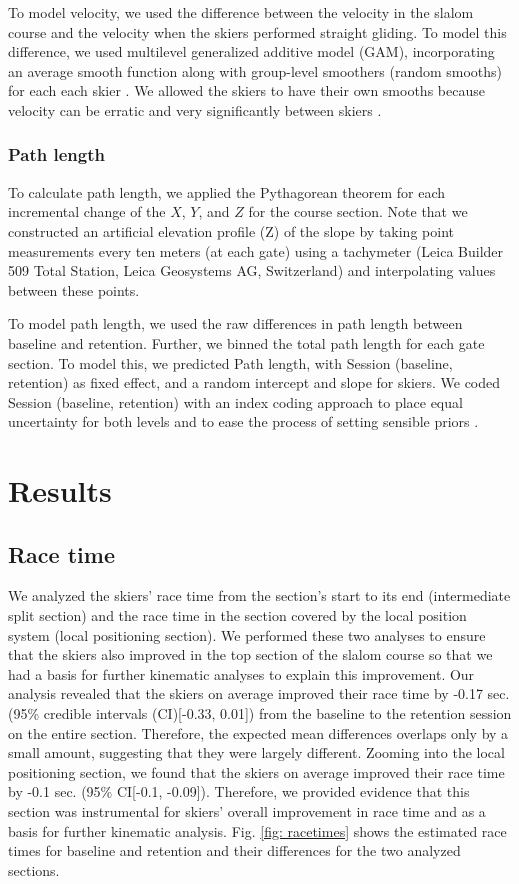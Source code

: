 \documentclass{article}
\begin{document}
To model velocity, we used the difference between the velocity in the slalom course and the velocity when the skiers performed straight gliding. To model this difference, we used multilevel generalized additive model (GAM), incorporating an average smooth function along with group-level smoothers (random smooths) for each each skier \cite{pedersen_hierarchical_2019}. We allowed the skiers to have their own smooths because velocity can be erratic and very significantly between skiers \cite{federolf_quantifying_2012, supej_impact_2015, reid_kinematic_2010}. 

\subsubsection{Path length}
To calculate path length, we applied the Pythagorean theorem for each incremental change of the $X$, $Y$, and $Z$ for the course section. Note that we constructed an artificial elevation profile (Z) of the slope by taking point measurements every ten meters (at each gate) using a tachymeter (Leica Builder 509 Total Station, Leica Geosystems AG, Switzerland) and interpolating values between these points. 

To model path length, we used the raw differences in path length between baseline and retention. Further, we binned the total path length for each gate section. To model this, we predicted Path length, with Session (baseline, retention) as fixed effect, and a random intercept and slope for skiers. We coded Session (baseline, retention) with an index coding approach to place equal uncertainty for both levels and to ease the process of setting sensible priors \cite{mcelreath_statistical_2018}.

\section{Results}

\subsection{Race time}
We analyzed the skiers' race time from the section's start to its end (intermediate split section) and the race time in the section covered by the local position system (local positioning section). We performed these two analyses to ensure that the skiers also improved in the top section of the slalom course so that we had a basis for further kinematic analyses to explain this improvement. Our analysis revealed that the skiers on average improved their race time by -0.17 sec. (95\% credible intervals (CI)[-0.33, 0.01]) from the baseline to the retention session on the entire section. Therefore, the expected mean differences overlaps only by a small amount, suggesting that they were largely different. Zooming into the local positioning section, we found that the skiers on average improved their  race time by -0.1 sec. (95\% CI[-0.1, -0.09]). Therefore, we provided evidence that this section was instrumental for skiers’ overall improvement in race time and as a basis for further kinematic analysis. Fig. \ref{fig: racetimes} shows the estimated race times for baseline and retention and their differences for the two analyzed sections. 
\end{document}
